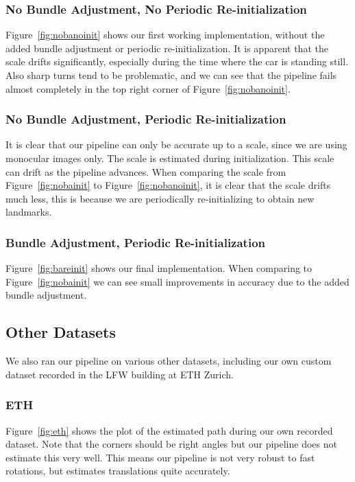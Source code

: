 \documentclass[11pt]{article}
\begin{document}
\subsubsection{No Bundle Adjustment, No Periodic Re-initialization}
Figure~\ref{fig:nobanoinit} shows our first working implementation, without the added bundle adjustment or periodic re-initialization. It is apparent that the scale drifts significantly, especially during the time where the car is standing still. Also sharp turns tend to be problematic, and we can see that the pipeline fails almost completely in the top right corner of Figure~\ref{fig:nobanoinit}.

\subsubsection{No Bundle Adjustment, Periodic Re-initialization}
It is clear that our pipeline can only be accurate up to a scale, since we are using monocular images only. The scale is estimated during initialization. This scale can drift as the pipeline advances. When comparing the scale from Figure~\ref{fig:nobainit} to Figure~\ref{fig:nobanoinit}, it is clear that the scale drifts much less, this is because we are periodically re-initializing to obtain new landmarks.

\subsubsection{Bundle Adjustment, Periodic Re-initialization}
Figure~\ref{fig:bareinit} shows our final implementation. When comparing to Figure~\ref{fig:nobainit} we can see small improvements in accuracy due to the added bundle adjustment.

\subsection{Other Datasets}
We also ran our pipeline on various other datasets, including our own custom dataset recorded in the LFW building at ETH Zurich.

\subsubsection{ETH}
Figure~\ref{fig:eth} shows the plot of the estimated path during our own recorded dataset. Note that the corners should be right angles but our pipeline does not estimate this very well. This means our pipeline is not very robust to fast rotations, but estimates translations quite accurately.
\end{document}
